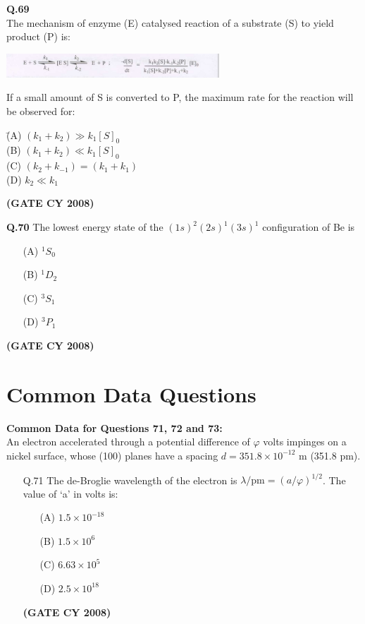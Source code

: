 \documentclass[12pt]{article}
\begin{document}
\begin{enumerate}
\vspace{0.5cm}

\textbf{Q.69} \\
The mechanism of enzyme (E) catalysed reaction of a substrate (S) to yield product (P) is:

\begin{center}
\includegraphics[width=0.6\textwidth]{figs/q69.png}
\end{center}

If a small amount of S is converted to P, the maximum rate for the reaction will be observed for:

\begin{tabbing}
\hspace{1cm} \= (A) \quad $(k_1 + k_2) \gg k_1 [S]_0$ \\
\> (B) \quad $(k_1 + k_2) \ll k_1 [S]_0$ \\
\> (C) \quad $(k_2 + k_{-1}) = (k_1 + k_1)$ \\
\> (D) \quad $k_2 \ll k_1$
\end{tabbing}   \textbf{(GATE CY 2008)}


\textbf{Q.70} The lowest energy state of the $(1s)^2(2s)^1(3s)^1$ configuration of Be is

\begin{enumerate}
\item[(A)] $^1S_0$
\item[(B)] $^1D_2$
\item[(C)] $^3S_1$
\item[(D)] $^3P_1$
\end{enumerate}   \textbf{(GATE CY 2008)}


\vspace{0.5cm}


\section*{Common Data Questions}

\textbf{Common Data for Questions 71, 72 and 73:} \\
An electron accelerated through a potential difference of $\varphi$ volts impinges on a nickel surface, whose (100) planes have a spacing $d = 351.8 \times 10^{-12}$ m (351.8 pm).

\begin{itemize}
    \item[Q.71] The de-Broglie wavelength of the electron is $\lambda/\text{pm} = (a/\varphi)^{1/2}$. The value of ‘a’ in volts is:
    \begin{enumerate}
        \item[(A)] $1.5 \times 10^{-18}$
        \item[(B)] $1.5 \times 10^6$
        \item[(C)] $6.63 \times 10^5$
        \item[(D)] $2.5 \times 10^{18}$
    \end{enumerate}   \textbf{(GATE CY 2008)}



\end{itemize}
\end{enumerate}
\end{document}
